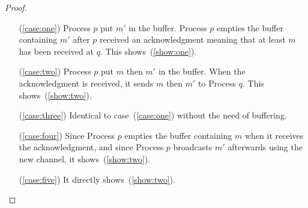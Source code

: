 \begin{proof}
  \begin{itemize}
  \item [(\ref{case:one})] Process $p$ put $m'$ in the buffer. Process $p$
    empties the buffer containing $m'$ after $p$ received an acknowledgment
    meaning that at least $m$ has been received at $q$. This
    shows~(\ref{show:one}).
  \item [(\ref{case:two})] Process $p$ put $m$ then $m'$ in the buffer. When the
    acknowledgment is received, it sends $m$ then $m'$ to Process $q$. This
    shows~(\ref{show:two}).
  \item [(\ref{case:three})] Identical to case~(\ref{case:one}) without the need
    of buffering.
  \item [(\ref{case:four})] Since Process $p$ empties the buffer containing $m$
    when it receives the acknowledgment, and since Process $p$ broadcasts $m'$
    afterwards using the new channel, it shows~(\ref{show:two}).
  \item [(\ref{case:five})] It directly shows~(\ref{show:two}).
  \end{itemize}

\end{proof}
